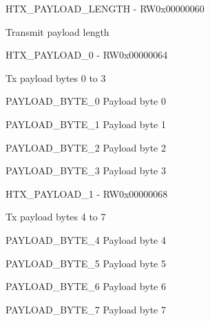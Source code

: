\documentclass{article}
\begin{document}
\begin{register}{H}{TX{\_}PAYLOAD{\_}LENGTH - RW}{0x00000060}  \par Transmit payload length \regnewline
  \label{TX_PAYLOAD_LENGTH}
\regnewline
\end{register}

\begin{register}{H}{TX{\_}PAYLOAD{\_}0 - RW}{0x00000064}  \par Tx payload bytes 0 to 3 \regnewline
  \label{TX_PAYLOAD_0}
\regnewline
  \begin{regdesc}\begin{reglist}
    \item [PAYLOAD{\_}BYTE{\_}0] Payload byte 0    \item [PAYLOAD{\_}BYTE{\_}1] Payload byte 1    \item [PAYLOAD{\_}BYTE{\_}2] Payload byte 2    \item [PAYLOAD{\_}BYTE{\_}3] Payload byte 3  \end{reglist}\end{regdesc}
\end{register}

\begin{register}{H}{TX{\_}PAYLOAD{\_}1 - RW}{0x00000068}  \par Tx payload bytes 4 to 7 \regnewline
  \label{TX_PAYLOAD_1}
\regnewline
  \begin{regdesc}\begin{reglist}
    \item [PAYLOAD{\_}BYTE{\_}4] Payload byte 4    \item [PAYLOAD{\_}BYTE{\_}5] Payload byte 5    \item [PAYLOAD{\_}BYTE{\_}6] Payload byte 6    \item [PAYLOAD{\_}BYTE{\_}7] Payload byte 7  \end{reglist}\end{regdesc}
\end{register}
\end{document}
